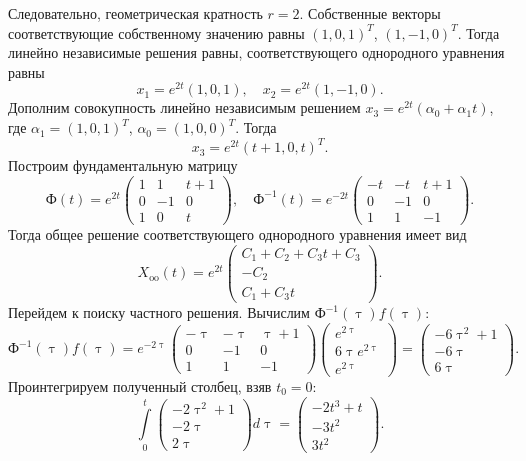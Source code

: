 \documentclass[a4paper, 12pt]{article}
\newcommand{\FI}{\text{Ф}}
\renewcommand{\tau}{\uptau}
\begin{document}
Следовательно, геометрическая кратность $r = 2$. Собственные векторы соответствующие собственному значению равны $(1,0,1)^T$, $(1,-1,0)^T$. Тогда линейно независимые решения равны, соответствующего однородного уравнения равны
$$x_1 = e^{2t}(1,0,1),\quad x_2 = e^{2t}(1,-1,0).$$
Дополним совокупность линейно независимым решением $x_3 = e^{2t}(\alpha_0 + \alpha_1t)$, где $\alpha_1 = (1,0,1)^T$, $\alpha_0 = (1,0,0)^T$. Тогда $$x_3 = e^{2t}(t+1, 0, t)^T.$$
Построим фундаментальную матрицу
$$\FI(t) = e^{2t}\begin{pmatrix}
	1 & 1 & t+1\\
	0 & -1 & 0\\
	1 & 0 & t
\end{pmatrix},\quad \FI^{-1}(t) = e^{-2t}\begin{pmatrix}
-t & -t & t+1\\
0 & -1 & 0\\
1 & 1 & -1
\end{pmatrix}.$$
Тогда общее решение соответствующего однородного уравнения имеет вид
$$X_{\text{oo}}(t) = e^{2t}\begin{pmatrix}
	C_1 + C_2 + C_3t + C_3\\
	-C_2\\
	C_1 + C_3t
\end{pmatrix}.$$
Перейдем к поиску частного решения. Вычислим $\FI^{-1}(\uptau)f(\uptau)$:
$$\FI^{-1}(\uptau)f(\uptau) = e^{-2\tau}\begin{pmatrix}
	-\tau & -\tau & \tau+1\\
	0 & -1 & 0\\
	1 & 1 & -1
\end{pmatrix}\begin{pmatrix}
	e^{2\tau}\\
	6\tau e^{2\tau}\\
	e^{2\tau}
\end{pmatrix} = \begin{pmatrix}
	-6\tau^2 + 1\\
	-6\tau\\
	6\tau
\end{pmatrix}.$$
Проинтегрируем полученный столбец, взяв $t_0 = 0$:
$$\int\limits_{0}^t\begin{pmatrix}
	-2\tau^2 + 1\\
	-2\tau\\
	2\tau
\end{pmatrix}d\tau = \begin{pmatrix}
-2t^3 + t\\
-3t^2\\
3t^2
\end{pmatrix}.$$
\end{document}
